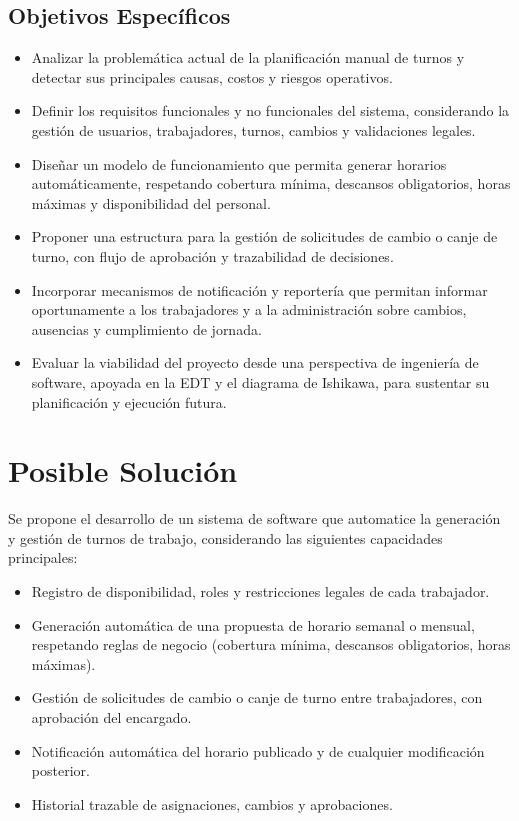 \documentclass[11pt,letterpaper]{article}
\begin{document}
\subsection{Objetivos Específicos}
\begin{itemize}[leftmargin=1.2cm]
    \item Analizar la problemática actual de la planificación manual de turnos y detectar sus principales causas, costos y riesgos operativos.
    \item Definir los requisitos funcionales y no funcionales del sistema, considerando la gestión de usuarios, trabajadores, turnos, cambios y validaciones legales.
    \item Diseñar un modelo de funcionamiento que permita generar horarios automáticamente, respetando cobertura mínima, descansos obligatorios, horas máximas y disponibilidad del personal.
    \item Proponer una estructura para la gestión de solicitudes de cambio o canje de turno, con flujo de aprobación y trazabilidad de decisiones.
    \item Incorporar mecanismos de notificación y reportería que permitan informar oportunamente a los trabajadores y a la administración sobre cambios, ausencias y cumplimiento de jornada.
    \item Evaluar la viabilidad del proyecto desde una perspectiva de ingeniería de software, apoyada en la EDT y el diagrama de Ishikawa, para sustentar su planificación y ejecución futura.
\end{itemize}

\section{Posible Solución}

Se propone el desarrollo de un sistema de software que automatice la generación y gestión de turnos de trabajo, considerando las siguientes capacidades principales:

\begin{itemize}[leftmargin=1.2cm]
    \item Registro de disponibilidad, roles y restricciones legales de cada trabajador.
    \item Generación automática de una propuesta de horario semanal o mensual, respetando reglas de negocio (cobertura mínima, descansos obligatorios, horas máximas).
    \item Gestión de solicitudes de cambio o canje de turno entre trabajadores, con aprobación del encargado.
    \item Notificación automática del horario publicado y de cualquier modificación posterior.
    \item Historial trazable de asignaciones, cambios y aprobaciones.
\end{itemize}
\end{document}
